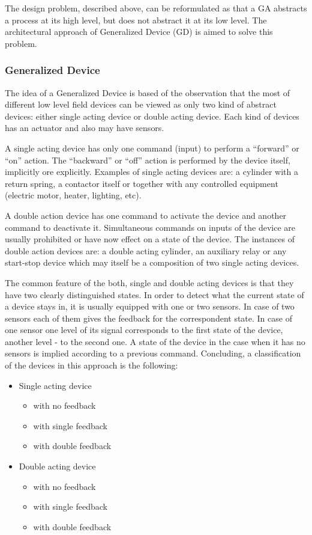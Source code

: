 The design problem, described above, can be reformulated as that a GA abstracts
a process at its high level, but does not abstract it at its low level. The
architectural approach of Generalized Device (GD) is aimed to solve this
problem.

\subsubsection{Generalized Device}

The idea of a Generalized Device is based of the observation that the most
of different low level field devices can be viewed as only two kind of abstract
devices: either single acting device or double acting device. Each kind
of devices has an actuator and also may have sensors.

A single acting device has only one command (input) to perform a ``forward'' or
``on'' action. The ``backward'' or ``off'' action is performed by the device
itself, implicitly ore explicitly. Examples of single acting devices are:
a cylinder with a return spring, a contactor itself or together with any
controlled equipment (electric motor, heater, lighting, etc).

A double action device has one command to activate the device and another
command to deactivate it. Simultaneous commands on inputs of the device are
usually prohibited or have now effect on a state of the device. The instances of
double action devices are: a double acting cylinder, an auxiliary relay or any
start-stop device which may itself be a composition of two single acting
devices.

The common feature of the both, single and double acting devices is that they
have two clearly distinguished states. In order to detect what the current state
of a device stays in, it is usually equipped with one or two sensors. In case of
two sensors each of them gives the feedback for the correspondent state. In case
of one sensor one level of its signal corresponds to the first state of the
device, another level - to the second one. A state of the device in the case
when it has no sensors is implied according to a previous command. Concluding,
a classification of the devices in this approach is the following:

\begin{itemize}
  \item Single acting device
	\begin{itemize}
	  \item with no feedback
	  \item with single feedback
	  \item with double feedback
	\end{itemize} 
  \item Double acting device
	\begin{itemize}
	  \item with no feedback
	  \item with single feedback
	  \item with double feedback
	\end{itemize} 
\end{itemize} 


